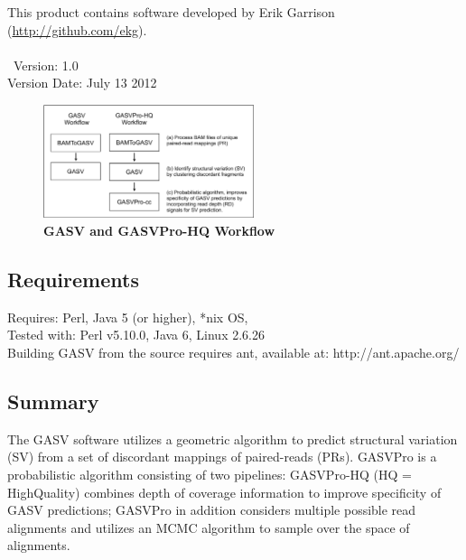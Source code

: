 \documentclass[11pt]{article}
\begin{document}
\noindent This product contains software developed by Erik Garrison (\url{http://github.com/ekg}).\\ \\ 
\
\noindent Version: 1.0\\
\noindent Version Date: July 13 2012

\begin{figure}
  \begin{center}
    \includegraphics[width=0.55\textwidth]{Figures/GASV_Workflow.pdf}
  \end{center}
  \caption{\textbf{GASV and GASVPro-HQ Workflow}}
  \label{fig:GASVWorkflow}
\end{figure}

\subsection{Requirements}
Requires: Perl, Java 5 (or higher), *nix OS, \\
\noindent Tested with: Perl v5.10.0, Java 6, Linux 2.6.26 \\

\noindent Building GASV from the source requires ant, available at: 
http://ant.apache.org/ 




\subsection{Summary}

The GASV software utilizes a geometric algorithm to predict structural variation (SV) from a set of discordant mappings of paired-reads (PRs).  GASVPro is a probabilistic algorithm consisting of two pipelines: GASVPro-HQ (HQ = HighQuality) combines depth of coverage information to improve specificity of GASV predictions; GASVPro in addition considers multiple possible read alignments and utilizes an MCMC algorithm to sample over the space of alignments.
\end{document}
